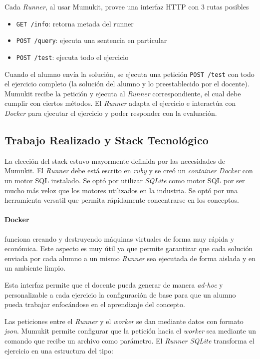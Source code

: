 Cada \textit{Runner}, al usar Mumukit, provee una interfaz HTTP con 3 rutas posibles

\begin{itemize}
    \item \texttt{GET /info}: retorna metada del runner
    \item \texttt{POST /query}: ejecuta una sentencia en particular
    \item \texttt{POST /test}: ejecuta todo el ejercicio
\end{itemize}

Cuando el alumno envía la solución, se ejecuta una petición
\texttt{POST /test} con todo el ejercicio completo (la solución
del alumno y lo preestablecido por el docente). Mumukit
recibe la petición y ejecuta al \textit{Runner} correspondiente,
el cual debe cumplir con ciertos métodos. El \textit{Runner}
adapta el ejercicio e interactúa con \textit{Docker} para
ejecutar el ejercicio y poder responder con la evaluación.


\subsection{Trabajo Realizado y Stack Tecnológico}

La elección del stack estuvo mayormente definida por las necesidades
de Mumukit. El \textit{Runner} debe está escrito en \textit{ruby}
y se creó un \textit{container Docker} con un motor SQL instalado.
Se optó por utilizar \textit{SQLite} como motor SQL
por ser mucho más veloz que los motores utilizados en
la industria. Se optó por una herramienta versatil
que permita rápidamente concentrarse en los conceptos.

\paragraph{Docker} funciona creando y destruyendo
máquinas virtuales de forma muy rápida y económica.
Este aspecto es muy útil ya que permite garantizar
que cada solución enviada por cada alumno a un
mismo \textit{Runner} sea ejecutada de forma aislada
y en un ambiente limpio.

Esta interfaz permite que el docente pueda
generar de manera \textit{ad-hoc} y personalizable
a cada ejercicio la configuración de base
para que un alumno pueda trabajar enfocándose
en el aprendizaje del concepto.

Las peticiones entre el \textit{Runner} y el \textit{worker}
se dan mediante datos con formato \textit{json}.
Mumukit permite configurar que la petición hacia el \textit{worker}
sea mediante un comando que recibe un archivo como parámetro.
El \textit{Runner SQLite} transforma el ejercicio en una estructura
del tipo:

